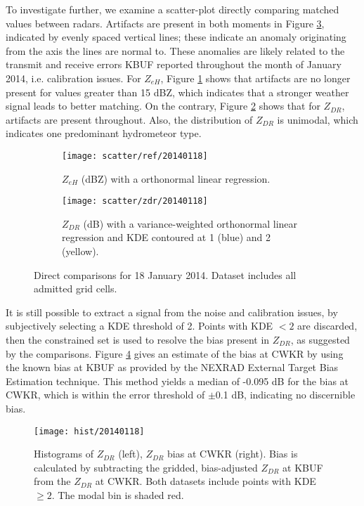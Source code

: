 To investigate further, we examine a scatter-plot directly comparing matched values between radars.
Artifacts are present in both moments in Figure
\ref{fig:scatter_20140118}, indicated by evenly spaced vertical lines; these indicate an anomaly
originating from the axis the lines are normal to. These anomalies are likely related to the transmit and receive errors KBUF reported throughout the month of January 2014, i.e. calibration issues. For
$Z_{eH}$, Figure \ref{fig:scatter_ref_20140118} shows that artifacts are no longer present for values
greater than 15 dBZ, which indicates that a
stronger weather signal leads to better matching. On the contrary, Figure \ref{fig:scatter_zdr_20140118}
shows that for $Z_{DR}$, artifacts are present throughout. Also, the distribution of $Z_{DR}$ is unimodal, which indicates one predominant hydrometeor type. 
\begin{figure}[H]
\centering
   \begin{subfigure}[t]{0.48\linewidth}
     \texttt{[image: scatter/ref/20140118]}
     \caption{$Z_{eH}$ (dBZ) with a orthonormal linear regression.}\label{fig:scatter_ref_20140118}
   \end{subfigure}
   \begin{subfigure}[t]{0.48\linewidth}
     \texttt{[image: scatter/zdr/20140118]}
     \caption{$Z_{DR}$ (dB) with a variance-weighted orthonormal linear regression and KDE contoured at 1 (blue) and 2 (yellow).}\label{fig:scatter_zdr_20140118}
   \end{subfigure}
\caption{Direct comparisons for 18 January 2014. Dataset includes all admitted grid cells.} \label{fig:scatter_20140118}
\end{figure}

It is still possible to extract a signal from the noise and calibration issues, by subjectively selecting a KDE threshold of 2. Points with KDE $< 2$ are discarded, then the constrained set is used to resolve the bias present in
$Z_{DR}$, as suggested by the comparisons. Figure \ref{fig:hist_20140118} gives an estimate of the
bias at CWKR by using the known bias at KBUF as provided by the NEXRAD
External Target Bias Estimation technique. This method yields a median of -0.095 dB for the bias at CWKR, which is within the error threshold of $\pm$0.1 dB, indicating no discernible bias.

\begin{figure}[H]
\texttt{[image: hist/20140118]}\centering
\caption{Histograms of $Z_{DR}$ (left), $Z_{DR}$ bias at CWKR (right). Bias is calculated by subtracting the gridded, bias-adjusted $Z_{DR}$ at KBUF from the
$Z_{DR}$ at CWKR. Both datasets include points with KDE $\geq 2$. The modal bin is shaded red.} 
\label{fig:hist_20140118}
\end{figure}



